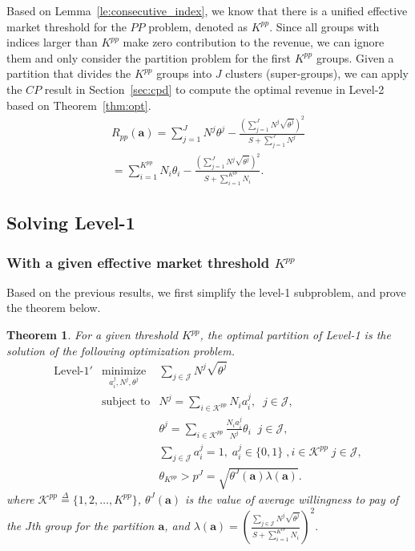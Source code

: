 \documentclass[twocolumn,10pt,twosided]{IEEEtran}
\newtheorem{theorem}{Theorem}
\begin{document}
Based on Lemma~\ref{le:consecutive_index}, we know that there is a unified effective market threshold for the $PP$ problem, denoted as $K^{pp}$. Since all groups with indices larger than $K^{pp}$ make zero contribution to the revenue,  we can ignore them and only consider the partition problem for the first $K^{pp}$ groups. Given a partition that divides the $K^{pp}$ groups into $J$ clusters (super-groups), we can apply the $CP$ result in Section~\ref{sec:cpd} to compute the optimal revenue in Level-2 based on Theorem~\ref{thm:opt}.
\begin{align}
R_{pp}(\boldsymbol{a})
=\sum_{j=1}^{J}{N^{j}}{\theta^j}-\frac{\left(\sum_{j=1}^{J}{N^j}\sqrt{{\theta^j}}\right)^2} {S+\sum_{j=1}^{J}{N^j}}\nonumber \\
=\sum_{i=1}^{K^{pp}}N_i\theta_i-\frac{\left(\sum_{j=1}^{J}{N^j}\sqrt{{\theta^j}}\right)^2}
{S+\sum_{i=1}^{ K^{pp}}N_i}.\label{eq:R_ppd_K0}
\end{align}

\subsection{Solving Level-1}
\label{sub:L1}
\subsubsection{With a given effective market threshold $K^{pp}$}
Based on the previous results, we first simplify the level-1 subproblem, and prove the theorem below. 

\begin{theorem}
For a given threshold $K^{pp}$, the optimal partition of Level-1 is the solution of the following optimization problem.
\begin{eqnarray}
\text{Level-1}'&\underset{a_i^j, N^j, \theta^j}{\text{minimize}}& \sum_{j\in \mathcal{J}} N^j\sqrt{\theta^j}\label{eq:obj}\nonumber\\
&\text{subject to}& N^j=\sum_{i\in\mathcal{K}^{pp}}N_i a_i^j,\;\;j\in\mathcal{J},\nonumber\\
&& \theta^j=\sum_{i\in\mathcal{K}^{pp}}\frac{N_ia_i^j}{N^j}\theta_i\;\;j\in\mathcal{J},\label{eq:theta}\nonumber\\
&&\sum_{j\in \mathcal{J}}a_i^j=1,\;a_i^j\in\{0,1\}\;,i\in\mathcal{K}^{pp}\;j\!\in\!\mathcal{J},\nonumber\\
&& \theta_{K^{pp}}>p^J=\sqrt{\theta^J(\boldsymbol{a})\lambda(\boldsymbol{a})}.\label{eq:pd_threshold_con}
\end{eqnarray}
where
$\mathcal{K}^{pp}\overset{\Delta}{=}\{1,2,\dots,K^{pp}\}$,  $\theta^J(\boldsymbol{a})$ is the value of average willingness to pay of the $J$th group for the partition $\boldsymbol{a}$, and $\lambda(\boldsymbol{a})=\left(\frac{\sum_{j\in\mathcal{J}}{N^j}\sqrt{{\theta^j}}}{S+\sum_{i=1}^{ K^{pp}}N_i}\right)^2.$
\end{theorem}
\end{document}
